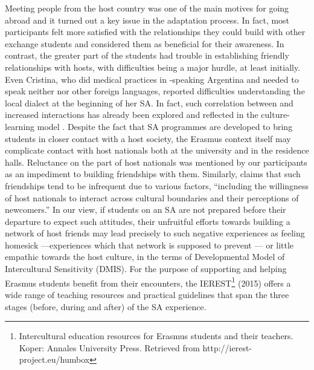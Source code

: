 \documentclass[output=paper]{langsci/langscibook}
\begin{document}
Meeting people from the host country was one of the main motives for going abroad and it turned out a key issue in the adaptation process. In fact, most participants felt more satisfied with the relationships they could build with other exchange students and considered them as beneficial for their  awareness. In contrast, the greater part of the students had trouble in establishing friendly relationships with hosts, with  difficulties being a major hurdle, at least initially. Even Cristina, who did medical practices in -speaking Argentina and needed to speak neither  nor other foreign languages, reported difficulties understanding the local dialect at the beginning of her SA. In fact, such correlation between   and increased  interactions has already been explored and reflected in the culture-learning model \citep{Ward2004}. Despite the fact that SA programmes are developed to bring students in closer contact with a host society, the Erasmus context itself may complicate contact with host nationals both at the university and in the residence halls. Reluctance on the part of host nationals was mentioned by our participants as an impediment to building friendships with them. Similarly, \citet[190]{Ward2004} claims that such  friendships tend to be infrequent due to various factors, “including the willingness of host nationals to interact across cultural boundaries and their perceptions of newcomers.” In our view, if students on an SA are not prepared before their departure to expect such attitudes, their unfruitful efforts towards building a network of host friends may lead precisely to such negative experiences as feeling homesick —experiences which that network is supposed to prevent \citep{HendricksonEtAl2011}— or little empathic towards the host culture, in the terms of  Developmental Model of Intercultural Sensitivity (DMIS). For the purpose of supporting and helping Erasmus students benefit from their  encounters, the IEREST\footnote{Intercultural education resources for Erasmus students and their teachers. Koper: Annales University Press. Retrieved from http://ierest-project.eu/humbox} (2015) offers a wide range of teaching resources and practical guidelines that span the three stages (before, during and after) of the SA experience.  
\end{document}

